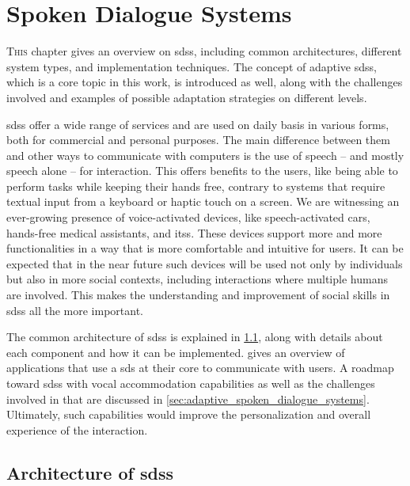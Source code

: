 \chapter{Spoken Dialogue Systems}
\label{chap:spoken_dialogue_systems}

\lettrine{T}{his} chapter gives an overview on \aclp{sds}, including common architectures, different system types, and implementation techniques.
The concept of adaptive \aclp{sds}, which is a core topic in this work, is introduced as well, along with the challenges involved and examples of possible adaptation strategies on different levels.

\pagebreak

\acresetall

\noindent
\Acfp{sds} offer a wide range of services and are used on daily basis in various forms, both for commercial and personal purposes.
The main difference between them and other ways to communicate with computers is the use of speech -- and mostly speech alone -- for interaction.
This offers benefits to the users, like being able to perform tasks while keeping their hands free, contrary to systems that require textual input from a keyboard or haptic touch on a screen.
We are witnessing an ever-growing presence of voice-activated devices, like speech-activated cars, hands-free medical assistants, and \acp{its}.
These devices support more and more functionalities in a way that is more comfortable and intuitive for users.
It can be expected that in the near future such devices will be used not only by individuals but also in more social contexts, including interactions where multiple humans are involved.
This makes the understanding and improvement of social skills in \acp{sds} all the more important.

The common architecture of \acp{sds} is explained in \cref{sec:architecture_sds}, along with details about each component and how it can be implemented.
 gives an overview of applications that use a \ac{sds} at their core to communicate with users.
A roadmap toward \acp{sds} with vocal accommodation capabilities as well as the challenges involved in that are discussed in \cref{sec:adaptive_spoken_dialogue_systems}.
Ultimately, such capabilities would improve the personalization and overall experience of the interaction.

\section{Architecture of \aclp{sds}}
\label{sec:architecture_sds}

